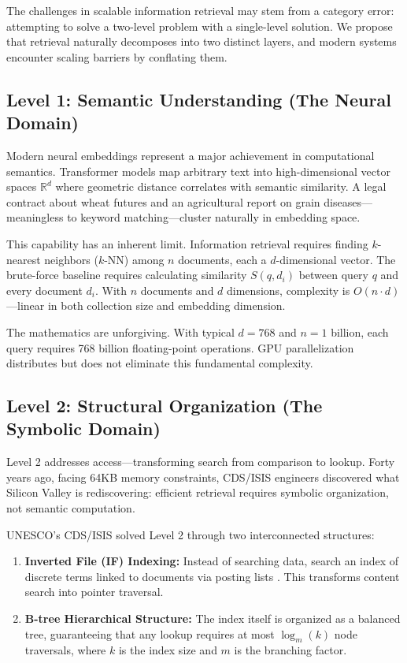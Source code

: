 \documentclass[manuscript,screen,nonacm]{acmart}
\begin{document}
The challenges in scalable information retrieval may stem from a category error: attempting to solve a two-level problem with a single-level solution. We propose that retrieval naturally decomposes into two distinct layers, and modern systems encounter scaling barriers by conflating them.

\subsection{Level 1: Semantic Understanding (The Neural Domain)}

Modern neural embeddings represent a major achievement in computational semantics. Transformer models map arbitrary text into high-dimensional vector spaces $\mathbb{R}^d$ where geometric distance correlates with semantic similarity. A legal contract about wheat futures and an agricultural report on grain diseases---meaningless to keyword matching---cluster naturally in embedding space.

This capability has an inherent limit. Information retrieval requires finding $k$-nearest neighbors ($k$-NN) among $n$ documents, each a $d$-dimensional vector. The brute-force baseline requires calculating similarity $S(q, d_i)$ between query $q$ and every document $d_i$. With $n$ documents and $d$ dimensions, complexity is $O(n \cdot d)$---linear in both collection size and embedding dimension.

The mathematics are unforgiving. With typical $d=768$ and $n=1$ billion, each query requires 768 billion floating-point operations. GPU parallelization distributes but does not eliminate this fundamental complexity.

\subsection{Level 2: Structural Organization (The Symbolic Domain)}

Level 2 addresses access---transforming search from comparison to lookup. Forty years ago, facing 64KB memory constraints, CDS/ISIS engineers discovered what Silicon Valley is rediscovering: efficient retrieval requires symbolic organization, not semantic computation.

UNESCO's CDS/ISIS solved Level 2 through two interconnected structures:
\begin{enumerate}
    \item \textbf{Inverted File (IF) Indexing:} Instead of searching data, search an index of discrete terms linked to documents via posting lists \cite{zobel2006}. This transforms content search into pointer traversal.
    \item \textbf{B-tree Hierarchical Structure:} The index itself is organized as a balanced tree, guaranteeing that any lookup requires at most $\log_m(k)$ node traversals, where $k$ is the index size and $m$ is the branching factor.
\end{enumerate}
\end{document}
